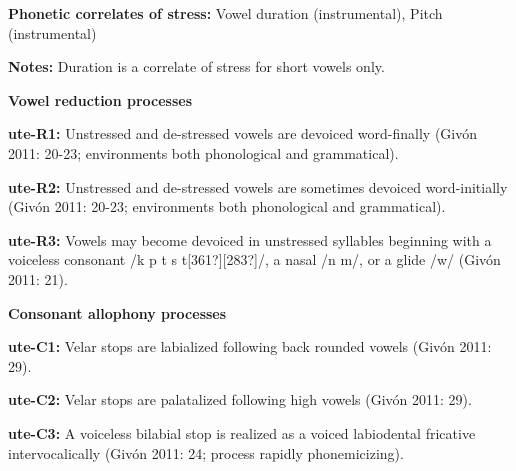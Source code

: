 \begin{styleBody}
\textbf{Phonetic correlates of stress: }Vowel duration (instrumental), Pitch (instrumental)
\end{styleBody}

\begin{styleBody}
\textbf{Notes: }Duration is a correlate of stress for short vowels only.
\end{styleBody}

\begin{styleBody}
\textbf{Vowel reduction processes}
\end{styleBody}

\begin{styleBody}
\textbf{ute-R1:} Unstressed and de-stressed vowels are devoiced word-finally (Givón 2011: 20-23; environments both phonological and grammatical).
\end{styleBody}

\begin{styleBody}
\textbf{ute-R2:} Unstressed and de-stressed vowels are sometimes devoiced word-initially (Givón 2011: 20-23; environments both phonological and grammatical).
\end{styleBody}

\begin{styleBody}
\textbf{ute-R3:} Vowels may become devoiced in unstressed syllables beginning with a voiceless consonant /k p t s t[361?][283?]/, a nasal /n m/, or a glide /w/ (Givón 2011: 21).
\end{styleBody}

\begin{styleBody}
\textbf{Consonant allophony processes}
\end{styleBody}

\begin{styleBody}
\textbf{ute-C1: }Velar stops are labialized following back rounded vowels (Givón 2011: 29).
\end{styleBody}

\begin{styleBody}
\textbf{ute-C2: }Velar stops are palatalized following high vowels (Givón 2011: 29).
\end{styleBody}

\begin{styleBody}
\textbf{ute-C3: }A voiceless bilabial stop is realized as a voiced labiodental fricative intervocalically (Givón 2011: 24; process rapidly phonemicizing).
\end{styleBody}

